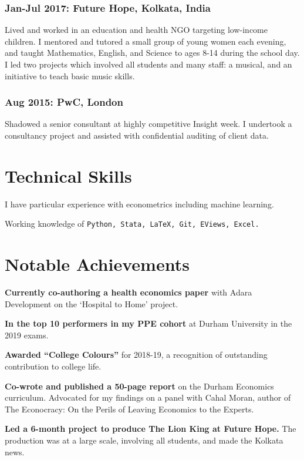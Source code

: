\documentclass[letterpaper]{article}
\renewenvironment{itemize}{
  \begin{list}{}{
    \setlength{\leftmargin}{1.5em}
  }
}{
  \end{list}
}
\begin{document}
\subsubsection*{Jan-Jul 2017: Future Hope, Kolkata, India}
Lived and worked in an education and health NGO targeting low-income children. I mentored and tutored a small group of young women each evening, and taught Mathematics, English, and Science to ages 8-14 during the school day. I led two projects which involved all students and many staff: a musical, and an initiative to teach basic music skills. 
\subsubsection*{Aug 2015: PwC, London}
Shadowed a senior consultant at highly competitive Insight week. I undertook a consultancy project and assisted with confidential auditing of client data.

\section*{Technical Skills}
\begin{itemize}
	\item I have particular experience with econometrics including machine learning.
	\item Working knowledge of \tt Python, Stata, LaTeX, Git, EViews, Excel.
\end{itemize}

\section*{Notable Achievements}
\begin{itemize}
	\item \textbf{Currently co-authoring a health economics paper} with Adara Development on the `Hospital to Home' project.
	\item \textbf{In the top 10 performers in my PPE cohort} at Durham University in the 2019 exams.
\item \textbf{Awarded “College Colours”} for 2018-19, a recognition of outstanding contribution to college life.
\item \textbf{Co-wrote and published a 50-page report} on the Durham Economics curriculum. Advocated for my findings on a panel with Cahal Moran, author of The Econocracy: On the Perils of Leaving Economics to the Experts.
\item \textbf{Led a 6-month project to produce The Lion King at Future Hope.} The production was at a large scale, involving all students, and made the Kolkata news.
\end{itemize}
\end{document}
